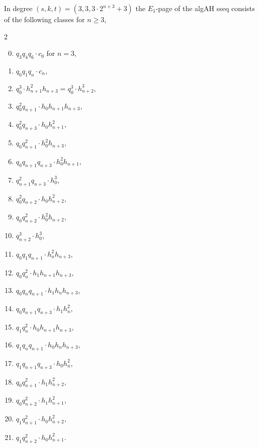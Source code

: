 \begin{lem} \label{candidates algAHSS}
  In degree $(s,k,t) = (3,3,3 \cdot 2^{n+3}+3)$ the $E_1$-page of the algAH sseq consists of the following classes for $n \geq 3$,
\begin{multicols}{2}
\begin{enumerate}
\setcounter{enumi}{-1}
\item $q_3q_4q_6 \cdot c_0$ for $n=3$,
\item $q_0q_1q_n \cdot c_n$,
\item $q_0^3 \cdot h_{n+1}^2h_{n+3} = q_0^3 \cdot h_{n+2}^3$,
\item $q_0^2q_{n+1} \cdot h_0h_{n+1}h_{n+3}$,
\item $q_0^2q_{n+3} \cdot h_0h_{n+1}^2$,
\item $q_0q_{n+1}^2 \cdot h_0^2h_{n+3}$,
\item $q_0q_{n+1}q_{n+3} \cdot h_0^2h_{n+1}$,
\item $q_{n+1}^2q_{n+3} \cdot h_0^3$,
\item $q_0^2q_{n+2} \cdot h_0h_{n+2}^2$,
\item $q_0q_{n+2}^2 \cdot h_0^2h_{n+2}$,
\item $q_{n+2}^3 \cdot h_0^3$,
\item $q_0q_1q_{n+1} \cdot h_{n}^2h_{n+3}$,
\item $q_0q_{n}^2 \cdot h_1h_{n+1}h_{n+3}$,
\item $q_0q_nq_{n+1} \cdot h_1h_{n}h_{n+3}$,
\item $q_0q_{n+1}q_{n+3} \cdot h_1h_{n}^2$,
\item $q_1q_{n}^2 \cdot h_0h_{n+1}h_{n+3}$,
\item $q_1q_nq_{n+1} \cdot h_0h_{n}h_{n+3}$,
\item $q_1q_{n+1}q_{n+3} \cdot h_0h_{n}^2$,
\item $q_0q_{n+1}^2 \cdot h_1h_{n+2}^2$,
\item $q_0q_{n+2}^2 \cdot h_1h_{n+1}^2$,
\item $q_1q_{n+1}^2 \cdot h_0h_{n+2}^2$,
\item $q_1q_{n+2}^2 \cdot h_0h_{n+1}^2$.
\end{enumerate}
\end{multicols}
\end{lem}

